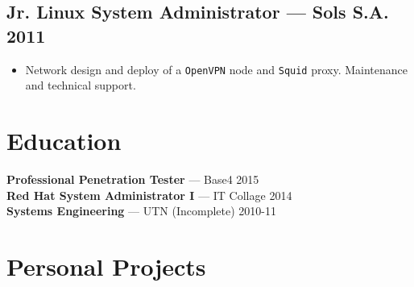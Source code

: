 \documentclass[11pt]{article}
\begin{document}
\subsection{Jr. Linux System Administrator --- Sols S.A. \hfill 2011}
\begin{itemize}
\item Network design and deploy of a \texttt{OpenVPN} node and \texttt{Squid} proxy. Maintenance and technical support.
\end{itemize}


\section{{\Large{\faGraduationCap}} Education}


{\bfseries{Professional Penetration Tester}} --- Base4 \hfill 2015 \\
{\bfseries{Red Hat System Administrator I}} --- IT Collage \hfill 2014 \\
{\bfseries{Systems Engineering}} --- UTN (Incomplete) \hfill 2010-11


\section{{\Large{\faLaptopCode}} Personal Projects}
\end{document}

